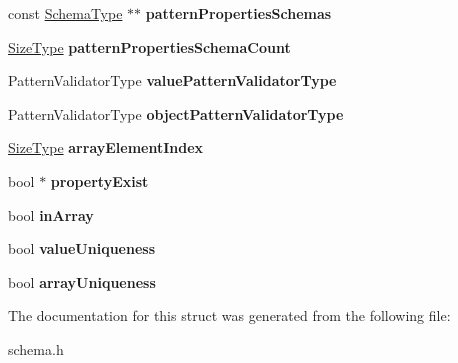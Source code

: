 \begin{DoxyCompactItemize}
\item 
const \hyperlink{a00261}{Schema\+Type} $\ast$$\ast$ {\bfseries pattern\+Properties\+Schemas}\hypertarget{a00263_a12c48f172fbaae2e883f9eb2614d860e}{}\label{a00263_a12c48f172fbaae2e883f9eb2614d860e}

\item 
\hyperlink{a00677_a5ed6e6e67250fadbd041127e6386dcb5}{Size\+Type} {\bfseries pattern\+Properties\+Schema\+Count}\hypertarget{a00263_a77d48b63f006479ab8c77f8192558441}{}\label{a00263_a77d48b63f006479ab8c77f8192558441}

\item 
Pattern\+Validator\+Type {\bfseries value\+Pattern\+Validator\+Type}\hypertarget{a00263_acc1ba6a63e678d0efff8a63d617c4d0d}{}\label{a00263_acc1ba6a63e678d0efff8a63d617c4d0d}

\item 
Pattern\+Validator\+Type {\bfseries object\+Pattern\+Validator\+Type}\hypertarget{a00263_add156192946b251ded2e11e24cfa9898}{}\label{a00263_add156192946b251ded2e11e24cfa9898}

\item 
\hyperlink{a00677_a5ed6e6e67250fadbd041127e6386dcb5}{Size\+Type} {\bfseries array\+Element\+Index}\hypertarget{a00263_a213dd0b8a746b1548bb28b12a17c2c1e}{}\label{a00263_a213dd0b8a746b1548bb28b12a17c2c1e}

\item 
bool $\ast$ {\bfseries property\+Exist}\hypertarget{a00263_a3e58787498af48ecceb97c47fb592d47}{}\label{a00263_a3e58787498af48ecceb97c47fb592d47}

\item 
bool {\bfseries in\+Array}\hypertarget{a00263_af18fc4ef754e8a52732e152854f06341}{}\label{a00263_af18fc4ef754e8a52732e152854f06341}

\item 
bool {\bfseries value\+Uniqueness}\hypertarget{a00263_a23e93ca88653ed878e3ddf290fc6bd9f}{}\label{a00263_a23e93ca88653ed878e3ddf290fc6bd9f}

\item 
bool {\bfseries array\+Uniqueness}\hypertarget{a00263_a0864c5e8155fe0064f17e8dcb31d93c7}{}\label{a00263_a0864c5e8155fe0064f17e8dcb31d93c7}

\end{DoxyCompactItemize}


The documentation for this struct was generated from the following file\+:\begin{DoxyCompactItemize}
\item 
schema.\+h\end{DoxyCompactItemize}
